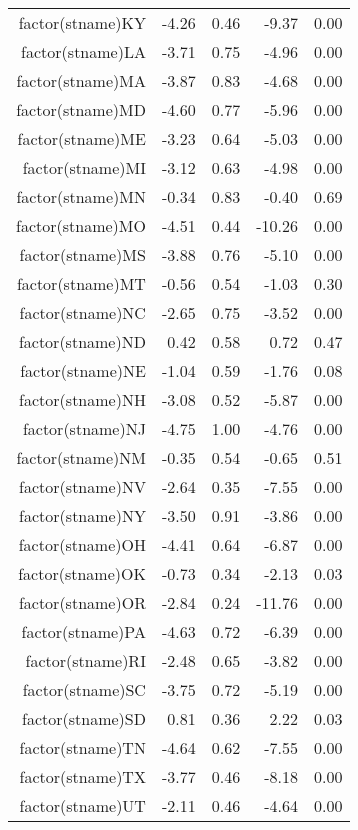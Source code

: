 \begin{table}[ht]
\begin{tabular}{rrrrr}
  factor(stname)KY & -4.26 & 0.46 & -9.37 & 0.00 \\ 
  factor(stname)LA & -3.71 & 0.75 & -4.96 & 0.00 \\ 
  factor(stname)MA & -3.87 & 0.83 & -4.68 & 0.00 \\ 
  factor(stname)MD & -4.60 & 0.77 & -5.96 & 0.00 \\ 
  factor(stname)ME & -3.23 & 0.64 & -5.03 & 0.00 \\ 
  factor(stname)MI & -3.12 & 0.63 & -4.98 & 0.00 \\ 
  factor(stname)MN & -0.34 & 0.83 & -0.40 & 0.69 \\ 
  factor(stname)MO & -4.51 & 0.44 & -10.26 & 0.00 \\ 
  factor(stname)MS & -3.88 & 0.76 & -5.10 & 0.00 \\ 
  factor(stname)MT & -0.56 & 0.54 & -1.03 & 0.30 \\ 
  factor(stname)NC & -2.65 & 0.75 & -3.52 & 0.00 \\ 
  factor(stname)ND & 0.42 & 0.58 & 0.72 & 0.47 \\ 
  factor(stname)NE & -1.04 & 0.59 & -1.76 & 0.08 \\ 
  factor(stname)NH & -3.08 & 0.52 & -5.87 & 0.00 \\ 
  factor(stname)NJ & -4.75 & 1.00 & -4.76 & 0.00 \\ 
  factor(stname)NM & -0.35 & 0.54 & -0.65 & 0.51 \\ 
  factor(stname)NV & -2.64 & 0.35 & -7.55 & 0.00 \\ 
  factor(stname)NY & -3.50 & 0.91 & -3.86 & 0.00 \\ 
  factor(stname)OH & -4.41 & 0.64 & -6.87 & 0.00 \\ 
  factor(stname)OK & -0.73 & 0.34 & -2.13 & 0.03 \\ 
  factor(stname)OR & -2.84 & 0.24 & -11.76 & 0.00 \\ 
  factor(stname)PA & -4.63 & 0.72 & -6.39 & 0.00 \\ 
  factor(stname)RI & -2.48 & 0.65 & -3.82 & 0.00 \\ 
  factor(stname)SC & -3.75 & 0.72 & -5.19 & 0.00 \\ 
  factor(stname)SD & 0.81 & 0.36 & 2.22 & 0.03 \\ 
  factor(stname)TN & -4.64 & 0.62 & -7.55 & 0.00 \\ 
  factor(stname)TX & -3.77 & 0.46 & -8.18 & 0.00 \\ 
  factor(stname)UT & -2.11 & 0.46 & -4.64 & 0.00 \\ 

\end{tabular}
\end{table}
